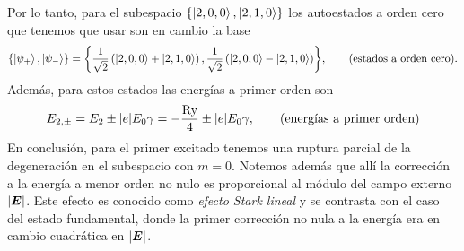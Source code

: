 \documentclass[10pt, a4paper]{article}
\newcommand{\Ry}{\ensuremath{\text{Ry}}}
\numberwithin{equation}{subsection}
\begin{document}
Por lo tanto, para el subespacio $\set{\ket{2,0,0},\ket{2,1,0}}$ los
autoestados a orden cero que tenemos que usar son en cambio la base
\begin{equation}
  \set{\ket{\psi_+}, \ket{\psi_-}} = \set{
    \frac{1}{\sqrt{2}}\left(\ket{2,0,0} + \ket{2,1,0}\right),
    \frac{1}{\sqrt{2}}\left(\ket{2,0,0} - \ket{2,1,0}\right)},
  \qquad \text{(estados a orden cero)}.
\end{equation}
Además, para estos estados las energías a primer orden son
\begin{equation}
  E_{2,\pm} = E_{2} \pm \abs{e}E_0\gamma = -\frac{\Ry}{4} \pm \abs{e}E_0\gamma,
  \qquad \text{(energías a primer orden)}
\end{equation}
En conclusión, para el primer excitado tenemos una ruptura parcial de la
degeneración en el subespacio con $m = 0$. Notemos además que allí la corrección
a la energía a menor orden no nulo es proporcional al módulo del campo externo
$\abs{\vb*{E}}$. Este efecto es conocido como \emph{efecto Stark lineal} y se
contrasta con el caso del estado fundamental, donde la primer corrección no
nula a la energía era en cambio cuadrática en $\abs{\vb*{E}}$.

\bigbreak
{}

\end{document}
